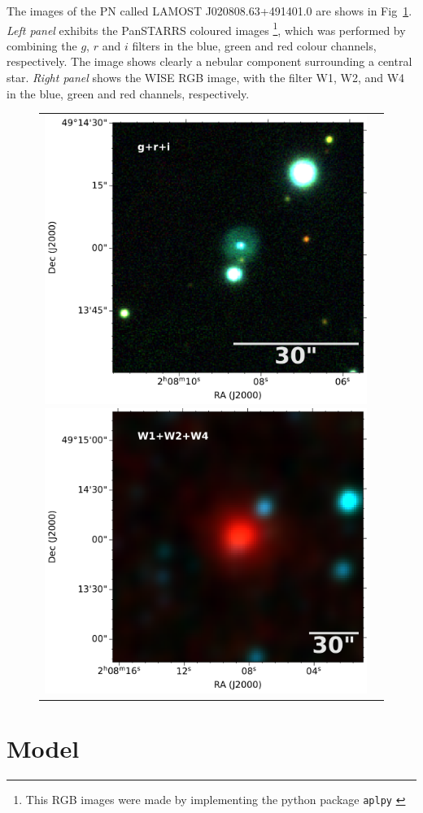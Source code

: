 \documentclass[twocolumn]{article}
\begin{document}
The images of the PN called LAMOST J020808.63+491401.0 are shows in Fig~\ref{fig:image}.
\textit{Left panel} exhibits the PanSTARRS coloured
images \footnote{This RGB images were made by implementing
the python package \texttt{aplpy} \citep{aplpy:2019}}, which
was performed by combining the $g$, $r$ and $i$ filters in
the blue, green and red colour channels, respectively.
The image shows clearly a nebular component surrounding 
a central star. \textit{Right panel} shows the
WISE RGB image, with the filter W1, W2, and W4 in
the blue, green and red channels, respectively.  

\begin{figure}
  \centering
  \begin{tabular}{l l}
\includegraphics[width=0.5\linewidth]{../image-panstarr/cutout_rings_v3_skycell_2294_031_stk_i_unconv-irg-RGB.pdf}
\includegraphics[width=0.5\linewidth]{../image-wise/w4_ra32_035994_dec49_233615-421-RGB.pdf}
\end{tabular}  
  \caption{} 
  \label{fig:image}
\end{figure}


\section{Model}
\label{sec:model}
\end{document}
